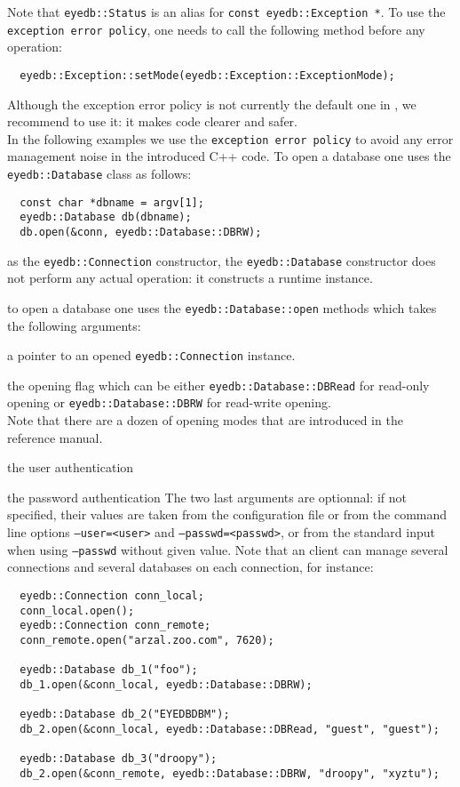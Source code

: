 \normalsize
\ei
Note that \texttt{eyedb::Status} is an alias for \texttt{const eyedb::Exception *}.
To use the \texttt{exception error policy}, one needs to call the following
method before any operation:
\verbsize
\begin{verbatim}
  eyedb::Exception::setMode(eyedb::Exception::ExceptionMode);
\end{verbatim}
\normalsize
Although the exception error policy is not currently the default one in
\eyedbX, we recommend to use it: it makes code clearer and safer.
\\
In the following examples we use the \texttt{exception error policy}
to avoid any error management noise in the introduced C++ code.
\ee
{}
To open a database one uses the \texttt{eyedb::Database} class as follows:
\verbsize
\begin{verbatim}
  const char *dbname = argv[1];
  eyedb::Database db(dbname);
  db.open(&conn, eyedb::Database::DBRW);
\end{verbatim}
\normalsize
\be
\item as the \texttt{eyedb::Connection} constructor, the \texttt{eyedb::Database}
constructor does not perform any actual operation: it constructs
a runtime instance.
\item to open a database one uses the \texttt{eyedb::Database::open} methods
which takes the following arguments:
\be
\item a pointer to an opened \texttt{eyedb::Connection} instance.
\item the opening flag which can be either \texttt{eyedb::Database::DBRead} for
read-only opening or \texttt{eyedb::Database::DBRW} for read-write opening.
\\
Note that there are a dozen of opening modes that are introduced in
the reference manual.
\item the user authentication
\item the password authentication
\ee
The two last arguments are optionnal: if not specified, their values
are taken from the configuration file or from the command line options
\texttt{--user=<user>} and \texttt{--passwd=<passwd>}, or from
the standard input when using \texttt{--passwd} without given value.
\ee
Note that an \eyedb client can manage several connections and
several databases on each connection, for instance:
\verbsize
\begin{verbatim}
  eyedb::Connection conn_local;
  conn_local.open();
  eyedb::Connection conn_remote;
  conn_remote.open("arzal.zoo.com", 7620);

  eyedb::Database db_1("foo");
  db_1.open(&conn_local, eyedb::Database::DBRW);

  eyedb::Database db_2("EYEDBDBM");
  db_2.open(&conn_local, eyedb::Database::DBRead, "guest", "guest");

  eyedb::Database db_3("droopy");
  db_2.open(&conn_remote, eyedb::Database::DBRW, "droopy", "xyztu");
\end{verbatim}
